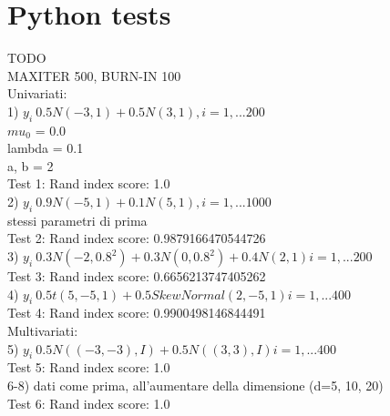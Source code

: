 \chapter{Python tests}
TODO \\
MAXITER 500, BURN-IN 100 \\
Univariati: \\
1) $y_i ~ 0.5 N(-3, 1) + 0.5 N(3, 1), i=1,... 200$ \\
$mu_0$ = 0.0 \\
lambda = 0.1 \\
a, b = 2 \\
Test 1: Rand index score: 1.0 \\
2) $y_i ~ 0.9 N(-5, 1) + 0.1 N(5, 1), i=1,... 1000$ \\
stessi parametri di prima \\
Test 2: Rand index score: 0.9879166470544726 \\
3) $y_i ~ 0.3 N(-2, 0.8^2) + 0.3 N(0, 0.8^2) + 0.4 N(2, 1) i=1,... 200$ \\
Test 3: Rand index score: 0.6656213747405262 \\
4) $y_i ~ 0.5 t(5, -5, 1 ) + 0.5 SkewNormal(2, -5, 1) i=1,... 400$ \\
Test 4: Rand index score: 0.9900498146844491 \\
Multivariati: \\
5) $y_i ~ 0.5 N((-3, -3), I) + 0.5 N((3, 3), I) i=1, ... 400$ \\
Test 5: Rand index score: 1.0 \\
6-8) dati come prima, all'aumentare della dimensione (d=5, 10, 20) \\
Test 6: Rand index score: 1.0

